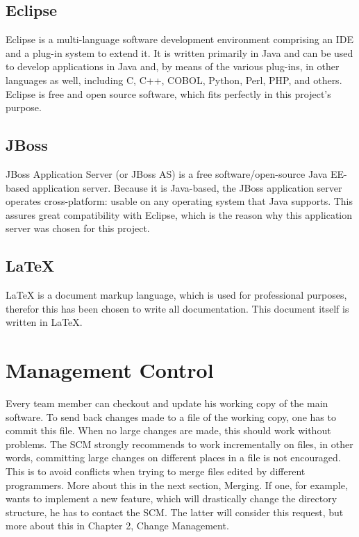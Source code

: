 \subsection{Eclipse}
Eclipse is a multi-language software development environment comprising an IDE and a plug-in system to extend it.
It is written primarily in Java and can be used to develop applications in Java and, by means of the various plug-ins, in other languages as well, including C, C++, COBOL, Python, Perl, PHP, and others.
Eclipse is free and open source software, which fits perfectly in this project's purpose.

\subsection{JBoss}
JBoss Application Server (or JBoss AS) is a free software/open-source Java EE-based application server. Because it is Java-based, the JBoss application server operates cross-platform: usable on any operating system that Java supports. This assures great compatibility with Eclipse, which is the reason why this application server was chosen for this project.

\subsection{LaTeX}
LaTeX is a document markup language, which is used for professional purposes, therefor this has been chosen to write all documentation. This document itself is written in LaTeX.

\section{Management Control}
Every team member can checkout and update his working copy of the main software.
To send back changes made to a file of the working copy, one has to commit this file.
When no large changes are made, this should work without problems.
The SCM strongly recommends to work incrementally on files, in other words, committing large changes on different places in a file is not encouraged.
This is to avoid conflicts when trying to merge files edited by different programmers. More about this in the next section, Merging.
If one, for example, wants to implement a new feature, which will drastically change the directory structure, he has to contact the SCM.
The latter will consider this request, but more about this in Chapter 2, Change Management.

